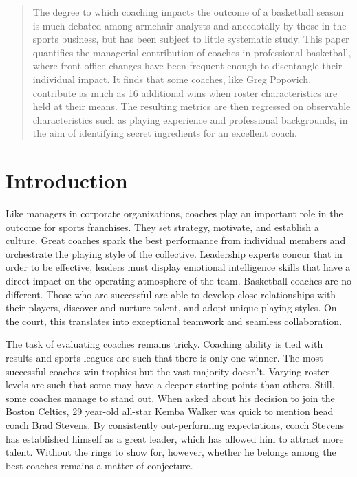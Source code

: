 \documentclass[main.tex]{subfiles}
\begin{document}
\begin{abstract}

The degree to which coaching impacts the outcome of a basketball season is much-debated among armchair analysts and anecdotally by those in the sports business, but has been subject to little systematic study. This paper quantifies the managerial contribution of coaches in professional basketball, where front office changes have been frequent enough to disentangle their individual impact. It finds that some coaches, like Greg Popovich, contribute as much as 16 additional wins when roster characteristics are held at their means. The resulting metrics are then regressed on observable characteristics such as playing experience and professional backgrounds, in the aim of identifying secret ingredients for an excellent coach. 

\end{abstract}

\section{Introduction}

Like managers in corporate organizations, coaches play an important role in the outcome for sports franchises. They set strategy, motivate, and establish a culture. Great coaches spark the best performance from individual members and orchestrate the playing style of the collective. Leadership experts concur that in order to be effective, leaders must display emotional intelligence skills that have a direct impact on the operating atmosphere of the team. Basketball coaches are no different. Those who are successful are able to develop close relationships with their players, discover and nurture talent, and adopt unique playing styles. On the court, this translates into exceptional teamwork and seamless collaboration.

The task of evaluating coaches remains tricky. Coaching ability is tied with results and sports leagues are such that there is only one winner. The most successful coaches win trophies but the vast majority doesn't.  Varying roster levels are such that some may have a deeper starting points than others. Still, some coaches manage to stand out. When asked about his decision to join the Boston Celtics, 29 year-old all-star Kemba Walker was quick to mention head coach Brad Stevens. By consistently out-performing expectations, coach Stevens has established himself as a great leader, which has allowed him to attract more talent. Without the rings to show for, however, whether he belongs among the best coaches remains a matter of conjecture.  
\end{document}
